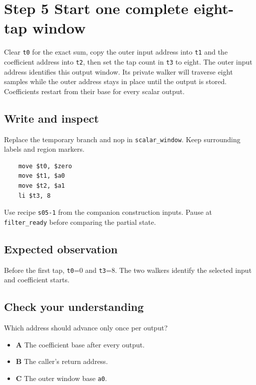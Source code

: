 \section{Step 5 Start one complete eight-tap window}\label{fir-s05}

Clear \texttt{t0} for the exact sum, copy the outer input address into \texttt{t1} and the coefficient address into \texttt{t2}, then set the tap count in \texttt{t3} to eight. The outer input address identifies this output window. Its private walker will traverse eight samples while the outer address stays in place until the output is stored. Coefficients restart from their base for every scalar output.

\subsection{Write and inspect}
Replace the temporary branch and nop in \texttt{scalar\_window}. Keep surrounding labels and region markers.

\begin{verbatim}
    move $t0, $zero
    move $t1, $a0
    move $t2, $a1
    li $t3, 8
\end{verbatim}
Use recipe \texttt{s05-1} from the companion construction inputs. Pause at \texttt{filter\_ready} before comparing the partial state.

\subsection{Expected observation}
Before the first tap, \texttt{t0}=0 and \texttt{t3}=8. The two walkers identify the selected input and coefficient starts.

\subsection{Check your understanding}
Which address should advance only once per output?

\begin{itemize}
  \item \textbf{A} The coefficient base after every output.
  \item \textbf{B} The caller’s return address.
  \item \textbf{C} The outer window base \texttt{a0}.
\end{itemize}
